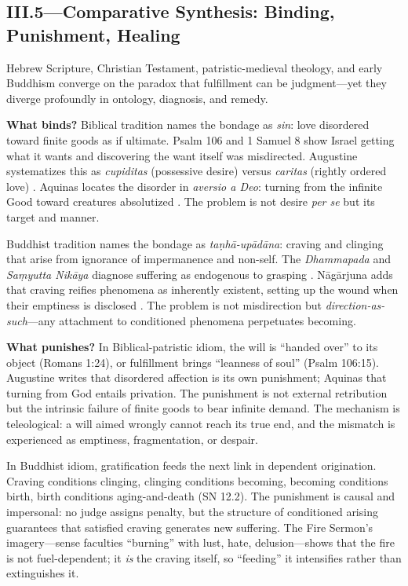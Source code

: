 \subsection*{III.5—Comparative Synthesis: Binding, Punishment, Healing}
\label{ssec:iii-synthesis}

Hebrew Scripture, Christian Testament, patristic-medieval theology, and early Buddhism
converge on the paradox that fulfillment can be judgment---yet they diverge profoundly in
ontology, diagnosis, and remedy.

\textbf{What binds?} Biblical tradition names the bondage as \emph{sin}: love disordered
toward finite goods as if ultimate. Psalm 106 and 1 Samuel 8 show Israel getting what it wants
and discovering the want itself was misdirected. Augustine systematizes this as
\emph{cupiditas} (possessive desire) versus \emph{caritas} (rightly ordered love)
. Aquinas locates the disorder in \emph{aversio a Deo}:
turning from the infinite Good toward creatures absolutized . The
problem is not desire \emph{per se} but its target and manner.

Buddhist tradition names the bondage as \emph{taṇhā-upādāna}: craving and clinging that arise
from ignorance of impermanence and non-self. The \emph{Dhammapada} and \emph{Saṃyutta Nikāya}
diagnose suffering as endogenous to grasping \parencite{BodhiSN2000}. Nāgārjuna adds that
craving reifies phenomena as inherently existent, setting up the wound when their emptiness is
disclosed \parencite{NagarjunaMMK2013}. The problem is not misdirection but
\emph{direction-as-such}---any attachment to conditioned phenomena perpetuates becoming.

\textbf{What punishes?} In Biblical-patristic idiom, the will is ``handed over'' to its object
(Romans 1:24), or fulfillment brings ``leanness of soul'' (Psalm 106:15). Augustine writes
that disordered affection is its own punishment; Aquinas that turning from God entails
privation. The punishment is not external retribution but the intrinsic failure of finite goods
to bear infinite demand. The mechanism is teleological: a will aimed wrongly cannot reach its
true end, and the mismatch is experienced as emptiness, fragmentation, or despair.

In Buddhist idiom, gratification feeds the next link in dependent origination. Craving
conditions clinging, clinging conditions becoming, becoming conditions birth, birth conditions
aging-and-death (SN 12.2). The punishment is causal and impersonal: no judge assigns penalty,
but the structure of conditioned arising guarantees that satisfied craving generates new
suffering. The Fire Sermon's imagery---sense faculties ``burning'' with lust, hate,
delusion---shows that the fire is not fuel-dependent; it \emph{is} the craving itself, so
``feeding'' it intensifies rather than extinguishes it.

